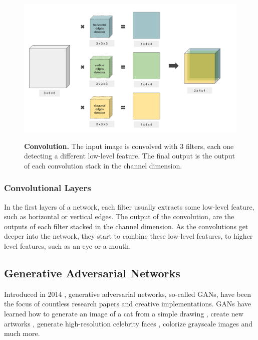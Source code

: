 \documentclass{article}
\begin{document}
\begin{figure}[h]
\centering
{\includegraphics[width=\linewidth]{GAN/convolutions}}
\caption{\label{fig:conv} \textbf{Convolution.} The input image is convolved with 3 filters, each one detecting a different low-level feature. The final output is the output of each convolution stack in the channel dimension.}
\end{figure}


\subsubsection{Convolutional Layers}
In the first layers of a network, each filter usually extracts some low-level feature, such as horizontal or vertical edges. The output of the convolution, are the outputs of each filter stacked in the channel dimension. As the convolutions get deeper into the network, they start to combine these low-level features, to higher level features, such as an eye or a mouth.





\subsection{Generative Adversarial Networks}

Introduced in 2014 \cite{goodfellow_generative_2014}, generative adversarial  networks, so-called GANs, have been the focus of countless research papers and creative implementations. GANs have learned how to generate an image of a cat from a simple drawing \cite{hesse_image--image_nodate}, create new artworks \cite{rkjones4_gangogh:_2018}, generate high-resolution celebrity faces \cite{karras_progressive_2017}, colorize grayscale images and much more.
\end{document}
